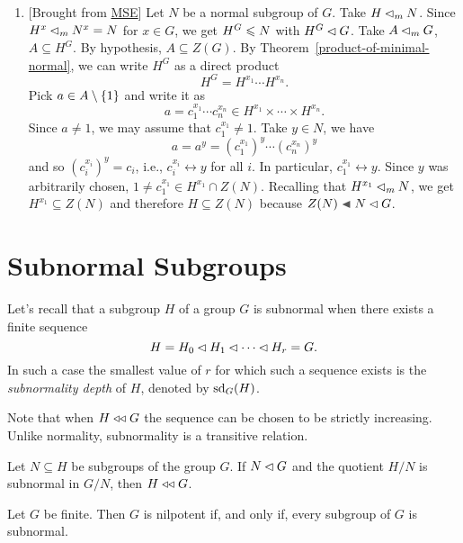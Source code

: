 \begin{solution}
\begin{enumerate}[\rm a)]
    \item {[Brought from \href{https://math.stackexchange.com/a/2703032/269050}{MSE}]} Let $N$ be a normal subgroup of $G$. Take $H\lhd_mN$. Since $H^x\lhd_mN^x=N$ for $x\in G$, we get $H^G\leqslant N$ with $H^G\lhd G$. Take $A\lhd_mG$, $A\subseteq H^G$. By hypothesis, $A\subseteq Z(G)$. By Theorem~\ref{product-of-minimal-normal}, we can write $H^G$ as a direct product
    $$
        H^G = H^{x_1}\cdots H^{x_n}.
    $$
    Pick $a\in A\setminus\{1\}$ and write it as
    $$
        a=c_1^{x_1}\cdots c_{n}^{x_n}
            \in H^{x_1}\times\cdots\times H^{x_n}.
    $$
    Since $a\ne1$, we may assume that $c_1^{x_1}\ne1$. Take $y\in N$, we have
    $$
        a = a^y = (c_1^{x_1})^y\cdots (c_n^{x_n})^y
    $$
    and so $(c_i^{x_i})^y=c_i$, i.e., $c_i^{x_i}\leftrightarrow y$ for all $i$. In particular, $c_1^{x_1}\leftrightarrow y$. Since $y$ was arbitrarily chosen, $1\ne c_1^{x_1}\in H^{x_1}\cap Z(N)$. Recalling that $H^{x_1}\lhd_mN$, we get $H^{x_1}\subseteq Z(N)$ and therefore $H\subseteq Z(N)$ because $Z(N)\ch N\normal G$.
\end{enumerate}
\end{solution}


\section{Subnormal Subgroups}
\begin{defn}
    Let's recall that a subgroup\/ $H$ of a group\/ $G$ is subnormal when there exists a finite sequence
    $$
        H = H_0 \lhd H_1 \lhd \cdots \lhd H_r = G.
    $$
    In such a case the smallest value of\/ $r$ for which such a sequence exists is the \textsl{subnormality depth} of\/ $H$, denoted by ${\rm sd}_G(H)$.
\end{defn}

\begin{rem}
    Note that when $H\mathrel{\triangleleft\triangleleft} G$ the sequence can be chosen to be strictly increasing. Unlike normality, subnormality is a transitive relation.
\end{rem}

\begin{rem}
    Let\/ $N\subseteq H$ be subgroups of the group\/ $G$. If $N\lhd G$ and the quotient $H/N$ is subnormal in $G/N$, then $H\mathrel{\triangleleft\triangleleft} G$.
\end{rem}

\begin{lem}\label{nilpotent-lemma}
    Let\/ $G$ be finite. Then\/ $G$ is nilpotent if, and only if, every subgroup of\/ $G$ is subnormal.
\end{lem}

